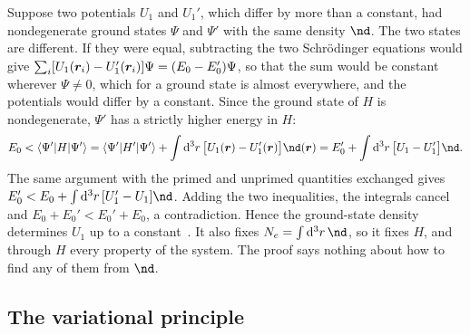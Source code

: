 Suppose two potentials $U_1$ and $U_1'$, which differ by more than a constant, had nondegenerate ground states $\Psi$ and $\Psi'$ with the same density $\nd$. The two states are different. If they were equal, subtracting the two Schr\"odinger equations would give $\sum_i[U_1(\bm{r}_i) - U_1'(\bm{r}_i)]\Psi = (E_0 - E_0')\Psi$, so that the sum would be constant wherever $\Psi \neq 0$, which for a ground state is almost everywhere, and the potentials would differ by a constant. Since the ground state of $H$ is nondegenerate, $\Psi'$ has a strictly higher energy in $H$:
\begin{equation*}
  E_0 < \langle\Psi'|H|\Psi'\rangle = \langle\Psi'|H'|\Psi'\rangle + \int\dd^3r\,\bigl[U_1(\vect{r}) - U_1'(\vect{r})\bigr]\nd(\vect{r}) = E_0' + \int\dd^3r\,\bigl[U_1 - U_1'\bigr]\nd .
\end{equation*}
The same argument with the primed and unprimed quantities exchanged gives $E_0' < E_0 + \int\dd^3r\,[U_1' - U_1]\nd$. Adding the two inequalities, the integrals cancel and $E_0 + E_0' < E_0' + E_0$, a contradiction. Hence the ground-state density determines $U_1$ up to a constant~\cite{hohenberg1964inhomogeneous}. It also fixes $N_e = \int\dd^3r\,\nd$, so it fixes $H$, and through $H$ every property of the system. The proof says nothing about how to find any of them from $\nd$.

\subsection*{The variational principle}


